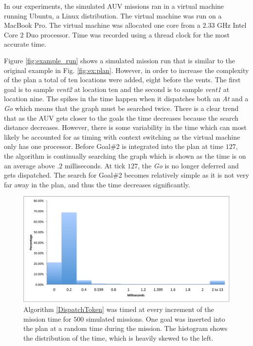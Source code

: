 In our experiments, the simulated AUV missions ran in a virtual
machine running Ubuntu, a Linux distribution. The virtual machine was
run on a MacBook Pro. The virtual machine was allocated one core from
a $2.33$ GHz Intel Core $2$ Duo processor. Time was
recorded using a thread clock for the most accurate time.

Figure \ref{fig:example_run} shows a simulated mission run that
is similar to the original example in Fig. \ref{fig:ex:plan}.
However, in order to increase the complexity of the plan a
total of ten locations were added, eight before the vents. The first goal is to
sample {\em vent2} at location ten and the second is to sample {\em
  vent1} at location nine. The spikes in the time happen when it
dispatches both an {\em At} and a {\em Go} which means that the graph
must be searched twice. There is a clear trend that as the AUV gets
closer to the goals the time decreases because the search distance
decreases.  However, there is some variability in the time which can
most likely be accounted for as timing with context switching as the
virtual machine only has one processor. Before Goal\#2 is integrated
into the plan at time $127$, the algorithm is continually searching the
graph which is shown as the time is on an average above $.2$
milliseconds. At tick $127$, the {\em Go} is no longer deferred and gets
dispatched. The search for Goal\#2 becomes relatively simple as it is
not very far away in the plan, and thus the time decreases
significantly.

\begin{figure}[!htbp]
  \centering
  \includegraphics[width=\columnwidth]{figs/HistogramAlg1}
  \caption{\small Algorithm \ref{DispatchToken} was 
  timed at every increment of the mission time for $500$ 
  simulated missions. One goal was inserted into the plan 
  at a random time during the mission. The histogram shows 
  the distribution of the time, which is heavily skewed to the left.}
  \label{fig:histogram}
\end{figure}

